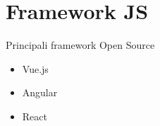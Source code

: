 \section[Framework]{Framework JS}
\begin{frame}[fragile]{Principali framework Open Source}\transfade\centering
  \begin{itemize}
    \item Vue.js
    \item Angular
    \item React
  \end{itemize}
  \end{frame}